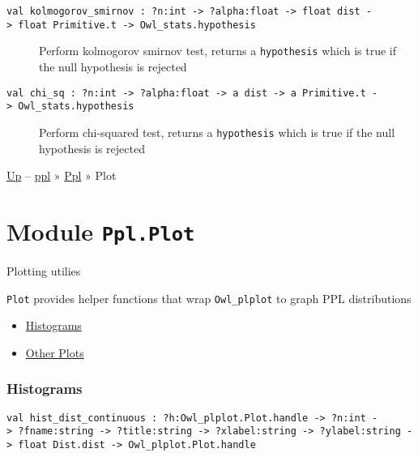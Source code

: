 \begin{description}
\item[{\protect\hyperlink{val-kolmogorovux5fsmirnov}{}\texttt{val\ kolmogorov\_smirnov\ :\ ?⁠n:int\ -\textgreater{}\ ?⁠alpha:float\ -\textgreater{}\ float\ dist\ -\textgreater{}\ float\ Primitive.t\ -\textgreater{}\ Owl\_stats.hypothesis}}]
Perform kolmogorov smirnov test, returns a \texttt{hypothesis} which is
true if the null hypothesis is rejected
\end{description}

\begin{description}
\item[{\protect\hyperlink{val-chiux5fsq}{}\texttt{val\ chi\_sq\ :\ ?⁠n:int\ -\textgreater{}\ ?⁠alpha:float\ -\textgreater{}\ \textquotesingle{}a\ dist\ -\textgreater{}\ \textquotesingle{}a\ Primitive.t\ -\textgreater{}\ Owl\_stats.hypothesis}}]
Perform chi-squared test, returns a \texttt{hypothesis} which is true if
the null hypothesis is rejected
\end{description}

\href{../index.html}{Up} -- \href{../../index.html}{ppl} »
\href{../index.html}{Ppl} » Plot

\section{\texorpdfstring{Module
\texttt{Ppl.Plot}}{Module Ppl.Plot}}\label{module-ppl.plot}

Plotting utilies

\texttt{Plot} provides helper functions that wrap \texttt{Owl\_plplot}
to graph PPL distributions

\begin{itemize}
\tightlist
\item
  \protect\hyperlink{histograms}{Histograms}
\item
  \protect\hyperlink{otherux5fplots}{Other Plots}
\end{itemize}

\hypertarget{histograms}{\subsubsection{\texorpdfstring{\protect\hyperlink{histograms}{}Histograms}{Histograms}}\label{histograms}}

\protect\hyperlink{val-histux5fdistux5fcontinuous}{}\texttt{val\ hist\_dist\_continuous\ :\ ?⁠h:Owl\_plplot.Plot.handle\ -\textgreater{}\ ?⁠n:int\ -\textgreater{}\ ?⁠fname:string\ -\textgreater{}\ ?⁠title:string\ -\textgreater{}\ ?⁠xlabel:string\ -\textgreater{}\ ?⁠ylabel:string\ -\textgreater{}\ float\ Dist.dist\ -\textgreater{}\ Owl\_plplot.Plot.handle}

